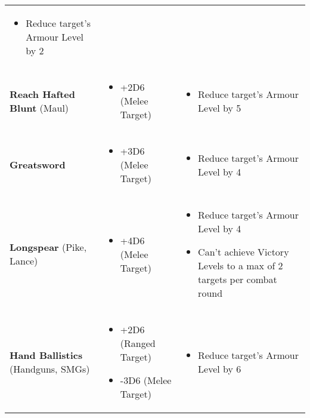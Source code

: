 \begin{center}
\begin{xltabular}{\textwidth}{|p{.25\textwidth} p{.3\textwidth} p{.35\textwidth}|}
\begin{itemize}
                    \item Reduce target’s Armour Level by 2
                \end{itemize} \\
        \raggedright\textbf{Reach Hafted Blunt} (Maul) &
            \begin{itemize}
                \item +2D6 (Melee Target)
            \end{itemize} &
                \begin{itemize}
                    \item Reduce target’s Armour Level by 5
                \end{itemize} \\
        \raggedright\textbf{Greatsword} &
            \begin{itemize}
                \item +3D6 (Melee Target)
            \end{itemize} &
                \begin{itemize}
                    \item Reduce target’s Armour Level by 4
                \end{itemize} \\
        \raggedright\textbf{Longspear} (Pike, Lance) &
            \begin{itemize}
                \item +4D6 (Melee Target)
            \end{itemize} &
                \begin{itemize}
                    \item Reduce target’s Armour Level by 4
                    \item Can’t achieve Victory Levels to a max of 2 targets per combat round
                \end{itemize} \\
        \raggedright\textbf{Hand Ballistics} (Handguns, SMGs) &
            \begin{itemize}
                \item +2D6 (Ranged Target)
                \item -3D6 (Melee Target)
            \end{itemize} &
                \begin{itemize}
                    \item Reduce target’s Armour Level by 6
                \end{itemize} \\

\end{xltabular}
\end{center}
